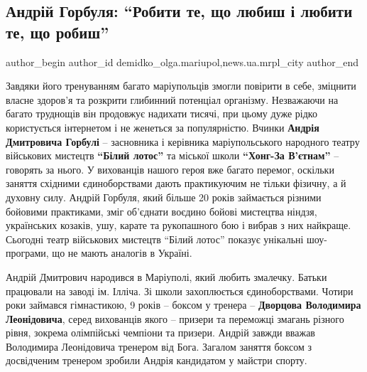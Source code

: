  
 
 
 
 
 
\subsection{Андрій Горбуля: \enquote{Робити те, що любиш і любити те, що робиш}}
\label{sec:31_07_2019.stz.news.ua.mrpl_city.1.andrij_gorbulja_robyty_te_scho_ljubysh}
 
\ifcmt
 author_begin
   author_id demidko_olga.mariupol,news.ua.mrpl_city
 author_end
\fi


Завдяки його тренуванням багато маріупольців змогли повірити в себе, зміцнити
власне здоров'я та розкрити глибинний потенціал організму. Незважаючи на багато
труднощів він продовжує надихати тисячі, при цьому дуже рідко користується
інтернетом і не женеться за популярністю. Вчинки \textbf{Андрія Дмитровича Горбулі} –
засновника і керівника маріупольського народного театру військових мистецтв
\textbf{\enquote{Білий лотос}} та міської школи \textbf{\enquote{Хонг-За В'єтнам}} – говорять за нього. У
вихованців нашого героя вже багато перемог, оскільки заняття східними
єдиноборствами дають практикуючим не тільки фізичну, а й духовну силу. Андрій
Горбуля, який більше 20 років займається різними бойовими практиками, зміг
об'єднати воєдино бойові мистецтва ніндзя, українських козаків, ушу, карате та
рукопашного бою і вибрав з них найкраще. Сьогодні театр військових мистецтв
\enquote{Білий лотос} показує унікальні шоу-програми, що не мають аналогів в Україні.

Андрій Дмитрович народився в Маріуполі, який любить змалечку. Батьки працювали
на заводі ім. Ілліча. Зі школи захоплюється єдиноборствами. Чотири роки займався
гімнастикою, 9 років – боксом у тренера – \textbf{Дворцова Володимира Леонідовича},
серед вихованців якого – призери та переможці змагань різного рівня, зокрема
олімпійські чемпіони та призери. Андрій завжди вважав Володимира Леонідовича
тренером від Бога. Загалом заняття боксом з досвідченим тренером зробили Андрія
кандидатом у майстри спорту.

